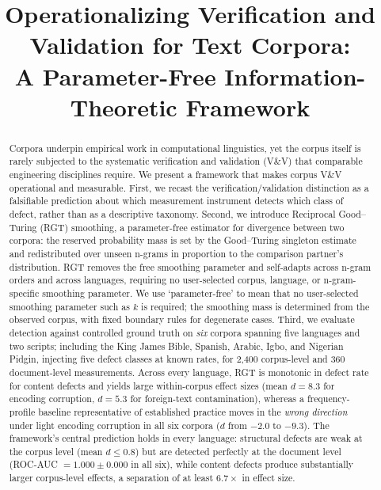 \documentclass[conference]{IEEEtran}
\begin{document}
\title{Operationalizing Verification and Validation for Text Corpora:\\
A Parameter-Free Information-Theoretic Framework}

\author{
}

\maketitle

\begin{abstract}
Corpora underpin empirical work in computational linguistics, yet the corpus
itself is rarely subjected to the systematic verification and validation (V\&V)
that comparable engineering disciplines require. We present a framework that
makes corpus V\&V operational and measurable. First, we recast the
verification/validation distinction as a falsifiable prediction about which
measurement instrument detects which class of defect, rather than as a
descriptive taxonomy. Second, we introduce Reciprocal Good--Turing (RGT)
smoothing, a parameter-free estimator for divergence between two corpora: the
reserved probability mass is set by the Good--Turing singleton estimate and
redistributed over unseen n-grams in proportion to the comparison partner's
distribution. RGT removes the free smoothing parameter and self-adapts across
n-gram orders and across languages, requiring no user-selected corpus, language, 
or n-gram-specific smoothing parameter. We use ‘parameter-free’ to mean that no user-selected smoothing parameter such as $k$ is required; the smoothing mass is determined from the observed corpus, with fixed boundary rules for degenerate cases. Third, we evaluate detection against
controlled ground truth on \emph{six} corpora spanning five languages and two
scripts; including the King James Bible, Spanish, Arabic, Igbo, and Nigerian
Pidgin, injecting five defect classes at known rates, for 2{,}400 corpus-level
and 360 document-level measurements. Across every language, RGT is monotonic in
defect rate for content defects and yields large within-corpus effect sizes
(mean $d=8.3$ for encoding corruption, $d=5.3$ for foreign-text contamination),
whereas a frequency-profile baseline representative of established practice moves
in the \emph{wrong direction} under light encoding corruption in all six corpora
($d$ from $-2.0$ to $-9.3$). The framework's central prediction holds in every
language: structural defects are weak at the corpus level (mean $d\le0.8$) but
are detected perfectly at the document level (ROC-AUC $=1.000\pm0.000$ in all
six), while content defects produce substantially larger corpus-level effects, 
a separation of at least $6.7\times$ in effect size.
\end{abstract}
\end{document}

